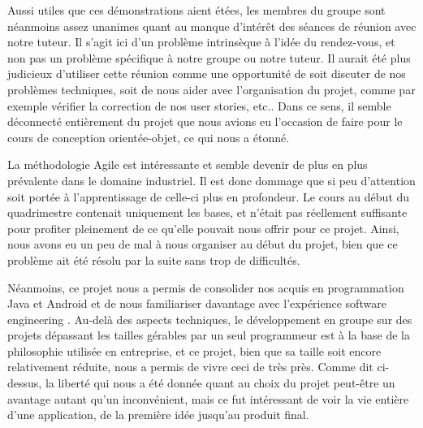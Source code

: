 \documentclass{elsarticle}
\begin{document}
Aussi utiles que ces démonstrations aient étées, les membres du groupe sont néanmoins assez unanimes quant au manque d'intérêt des séances de réunion avec notre tuteur.
Il s'agit ici d'un problème intrinsèque à l'idée du rendez-vous, et non pas un problème spécifique à notre groupe ou notre tuteur.
Il aurait été plus judicieux d'utiliser cette réunion comme une opportunité de soit discuter de nos problèmes techniques, soit de nous aider avec l'organisation du projet, comme par exemple vérifier la correction de nos user stories, etc..
Dans ce sens, il semble déconnecté entièrement du projet que nous avions eu l'occasion de faire pour le cours de conception orientée-objet, ce qui nous a étonné.

La méthodologie Agile est intéressante et semble devenir de plus en plus prévalente dans le domaine industriel.
Il est donc dommage que si peu d'attention soit portée à l'apprentissage de celle-ci plus en profondeur.
Le cours au début du quadrimestre contenait uniquement les bases, et n'était pas réellement suffisante pour profiter pleinement de ce qu'elle pouvait nous offrir pour ce projet.
Ainsi, nous avons eu un peu de mal à nous organiser au début du projet, bien que ce problème ait été résolu par la suite sans trop de difficultés.

Néanmoins, ce projet nous a permis de consolider nos acquis en programmation Java et Android et de nous familiariser davantage avec l'expérience \og software engineering \fg.
Au-delà des aspects techniques, le développement en groupe sur des projets dépassant les tailles gérables par un seul programmeur est à la base de la philosophie utilisée en entreprise, et ce projet, bien que sa taille soit encore relativement réduite, nous a permis de vivre ceci de très près.
Comme dit ci-dessus, la liberté qui nous a été donnée quant au choix du projet peut-être un avantage autant qu'un inconvénient, mais ce fut intéressant de voir la vie entière d'une application, de la première idée jusqu'au produit final.


\end{document}
